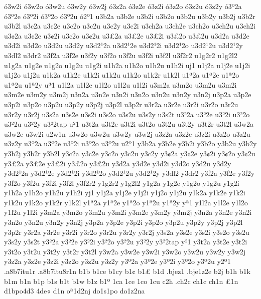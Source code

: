 {^^f33w2i
^^f33w2o
^^f33w2u
^^f33w2y
^^f33w2j
^^f33z2a
^^f33z2e
^^f33z2i
^^f33z2o
^^f33z2u
^^f33z2y
^^f33^^ba2a
^^f33^^ba2e
^^f33^^ba2i
^^f33^^ba2o
^^f33^^ba2u
^^f32^^ba1                       
u3b2a 
u3b2e 
u3b2i 
u3b2o
u3b2u
u3b2y
u3b2j
u3b2r
u3b2l
u3c2a
u3c2e
u3c2o
u3c2u
u3c2y
u3c2i
u3ch2a
u3ch2e
u3ch2o
u3ch2u
u3ch2i
u3^^a22a
u3^^a22e
u3^^a22i
u3^^a22o
u3^^a22u
u3^^a32a
u3^^a32e
u3^^a32i
u3^^a32o
u3^^a32u
u3d2a
u3d2e
u3d2i
u3d2o
u3d2u
u3d2y
u3d2^^b92a
u3d2^^b92e
u3d2^^b92i
u3d2^^b92o
u3d2^^b92u
u3d2^^b92y
u3dl2
u3dr2
u3f2a
u3f2e
u3f2y
u3f2o
u3f2u
u3f2i
u3f2l
u3f2r2
u1g2r2
u1g2l2
u1g2a
u1g2e
u1g2o
u1g2u
u1g2i
u1h2a
u1h2o
u1h2u
u1h2i
uj1
u1j2a
u1j2e
u1j2i
u1j2o
u1j2u
u1k2a
u1k2e
u1k2i
u1k2u
u1k2o
u1k2r
u1k2l
u1^^aa2a
u1^^aa2e
u1^^aa2o
u1^^aa2u
u1^^aa2y
u^^aa1
u1l2a
u1l2e
u1l2o
u1l2u
u1l2i
u3m2a
u3m2o
u3m2u
u3m2i
u3m2e
u3m2y
u3m2j
u3n2a
u3n2e
u3n2i
u3n2o
u3n2u
u3n2y
u3n2j
u3p2a
u3p2e
u3p2i
u3p2o
u3p2u
u3p2y
u3p2j
u3p2l
u3p2r
u3r2a
u3r2e
u3r2i
u3r2o
u3r2u
u3r2y
u3r2j
u3s2a
u3s2e
u3s2i
u3s2o
u3s2u
u3s2y
u3s2t
u3^^b22a
u3^^b22e
u3^^b22i
u3^^b22o
u3^^b22u
u3^^b22y
u3^^b22tap
u^^b21
u3t2a
u3t2e
u3t2i
u3t2o
u3t2u
u3t2y
u3t2r
u3t2l
u3w2a
u3w2e
u3w2i
u2w1n
u3w2o
u3w2u
u3w2y
u3w2j
u3z2a
u3z2e
u3z2i
u3z2o
u3z2u
u3z2y
u3^^ba2a
u3^^ba2e
u3^^ba2i
u3^^ba2o
u3^^ba2u
u2^^ba1                       
y3b2a 
y3b2e 
y3b2i 
y3b2o
y3b2u
y3b2y
y3b2j
y3b2r
y3b2l
y3c2a
y3c2e
y3c2o
y3c2u
y3c2y
y3^^a22a
y3^^a22e
y3^^a22i
y3^^a22o
y3^^a22u
y3^^a32a
y3^^a32e
y3^^a32i
y3^^a32o
y3^^a32u
y3d2a
y3d2e
y3d2i
y3d2o
y3d2u
y3d2y
y3d2^^b92a
y3d2^^b92e
y3d2^^b92i
y3d2^^b92o
y3d2^^b92u
y3d2^^b92y
y3dl2
y3dr2
y3f2a
y3f2e
y3f2y
y3f2o
y3f2u
y3f2i
y3f2l
y3f2r2
y1g2r2
y1g2l2
y1g2a
y1g2e
y1g2o
y1g2u
y1g2i
y1h2a
y1h2o
y1h2u
y1h2i
yj1
y1j2a
y1j2e
y1j2i
y1j2o
y1j2u
y1k2a
y1k2e
y1k2i
y1k2u
y1k2o
y1k2r
y1k2l
y1^^aa2a
y1^^aa2e
y1^^aa2o
y1^^aa2u
y1^^aa2y
y^^aa1
y1l2a
y1l2e
y1l2o
y1l2u
y1l2i
y3m2a
y3m2o
y3m2u
y3m2i
y3m2e
y3m2y
y3m2j
y3n2a
y3n2e
y3n2i
y3n2o
y3n2u
y3n2y
y3n2j
y3p2a
y3p2e
y3p2i
y3p2o
y3p2u
y3p2y
y3p2j
y3p2l
y3p2r
y3r2a
y3r2e
y3r2i
y3r2o
y3r2u
y3r2y
y3r2j
y3s2a
y3s2e
y3s2i
y3s2o
y3s2u
y3s2y
y3s2t
y3^^b22a
y3^^b22e
y3^^b22i
y3^^b22o
y3^^b22u
y3^^b22y
y3^^b22tap
y^^b21
y3t2a
y3t2e
y3t2i
y3t2o
y3t2u
y3t2y
y3t2r
y3t2l
y3w2a
y3w2e
y3w2i
y3w2o
y3w2u
y3w2y
y3w2j
y3z2a
y3z2e
y3z2i
y3z2o
y3z2u
y3z2y
y3^^ba2a
y3^^ba2e
y3^^ba2i
y3^^ba2o
y3^^ba2u
y2^^ba1                       
.a8b7itu1r
.a8b7itu8r1n
b1b
b1ce
b1cy
b1^^a2
b1^^a3
b1d
.bjez1
.bje1z2e
b2j
b1h
b1k
b1m
b1n
b1p
b1s
b1t
b1w
b1z
b1^^ba
1ca
1ce
1co
1cu
c2h
.ch2c
ch1^^a2
ch1n
^^a31n
d1bpo4d3
4de^^ab
d1n
o^^aa1d2nj
do1s1po
do1z2na
}
